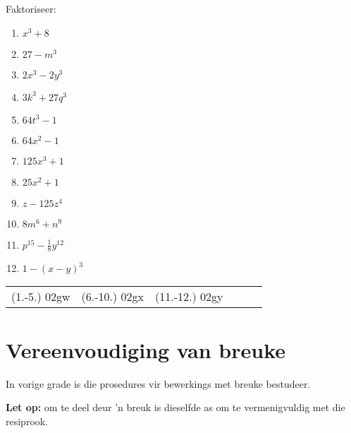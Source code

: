\begin{exercises}{}
{

Faktoriseer:
\begin{multicols}{2}
\begin{enumerate}[itemsep=5pt, label=\textbf{\arabic*}. ] 
\item ${x}^{3}+8$
\item $27-m^{3}$
\item $2x^{3}-2y^{3}$
\item $3k^{3} + 27q^{3}$
\item $64t^{3}-1$
\item $64x^{2} -1$
\item $125x^{3} +1$
\item $25x^{2} +1$
\item $z-125z^4{}$
\item $8m^{6} + n^{9}$
\item $p^{15} - \frac{1}{8}y^{12}$
\item $1- (x-y)^3$
\end{enumerate}
\end{multicols}

\par \practiceinfo
\par \begin{tabular}[h]{cccccc}
(1.-5.)	02gw	&
(6.-10.)	02gx	&
(11.-12.)	02gy	&
\\ %
\end{tabular}
}
\end{exercises}

\section{Vereenvoudiging van breuke}
\nopagebreak

In vorige grade is die prosedures vir bewerkings met breuke bestudeer.

\textbf{Let op:} om te deel deur 'n breuk is dieselfde as om te vermenigvuldig met die resiprook.\par

